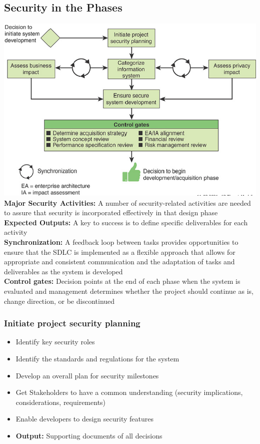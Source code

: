 \subsection{Security in the Phases}
\includegraphics[width=\linewidth]{../img/security_in_phases.png}
\textbf{Major Security Activities:} A number of
security-related activities are needed to assure
that security is incorporated effectively in that
design phase\\
\textbf{Expected Outputs:} A key to success is to
define specific deliverables for each activity\\
\textbf{Synchronization:} A feedback loop between
tasks provides opportunities to ensure that the
SDLC is implemented as a flexible approach
that allows for appropriate and consistent
communication and the adaptation of tasks and
deliverables as the system is developed\\
\textbf{Control gates:} Decision points at the end of
each phase when the system is evaluated and
management determines whether the project
should continue as is, change direction, or be
discontinued\\

\subsubsection{Initiate project security planning}
\begin{itemize}
    \item Identify key security roles
    \item Identify the standards and regulations for the system
    \item Develop an overall plan for security milestones
    \item Get Stakeholders to have a common understanding (security implications, considerations, requirements)
    \item Enable developers to design security features
    \item \textbf{Output:} Supporting documents of all decisions
\end{itemize}

